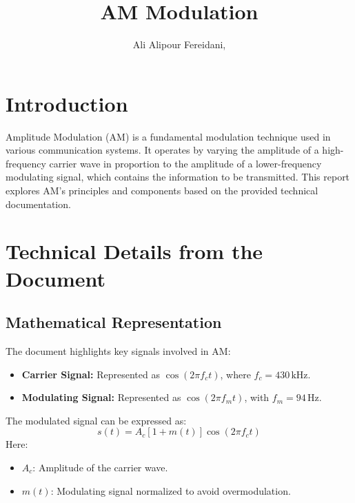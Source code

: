 \documentclass[paper=a4, fontsize=11pt, onecolumn]{scrartcl}	 %
\title{AM Modulation} %
\author{Ali Alipour Fereidani, } %
\date{} %
\begin{document}
\maketitle %

\thispagestyle{fancy} %



\section*{Introduction}
Amplitude Modulation (AM) is a fundamental modulation technique used in various communication systems. It operates by varying the amplitude of a high-frequency carrier wave in proportion 
to the amplitude of a lower-frequency modulating signal, which contains the information to be transmitted. This report explores AM's principles and components based on the provided technical documentation.

\section*{Technical Details from the Document}

\subsection*{Mathematical Representation}
The document highlights key signals involved in AM:
\begin{itemize}
    \item \textbf{Carrier Signal:} Represented as \( \cos(2\pi f_c t) \), where \( f_c = 430 \, \text{kHz} \).
    \item \textbf{Modulating Signal:} Represented as \( \cos(2\pi f_m t) \), with \( f_m = 94 \, \text{Hz} \).
\end{itemize}

The modulated signal can be expressed as:
\[
s(t) = A_c \left[1 + m(t)\right] \cos(2\pi f_c t)
\]
Here:
\begin{itemize}
    \item \( A_c \): Amplitude of the carrier wave.
    \item \( m(t) \): Modulating signal normalized to avoid overmodulation.
\end{itemize}
\end{document}
